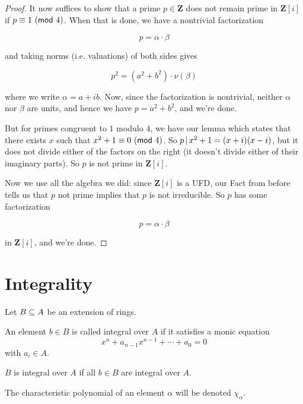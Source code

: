 \begin{proof}
  It now suffices to show that a prime \(p\in{\mathbf Z}\) does not remain prime
  in \({\mathbf Z}[i]\) if \(p\equiv 1\Mod 4\). When that is done, we have a
  nontrivial factorization

  \[ p=\alpha\cdot\beta \]

  and taking norms (i.e. valuations) of both sides gives

  \[ p^2 = (a^2 + b^2) \cdot\nu(\beta) \]

  where we write \(\alpha = a+ib\). Now, since the factorization is nontrivial,
  neither \(\alpha\) nor \(\beta\) are units, and hence we have \( p = a^2 + b^2
  \), and we're done.

  But for primes congruent to \(1\) modulo \(4\), we have our lemma which states
  that there exists \(x\) such that \(x^2+1\equiv 0\Mod 4\). So \(\divides p {x^2+1 =
  (x+i)(x-i)}\), but it does not divide either of the factors on the right (it
  doesn't divide either of their imaginary parts). So \(p\) is not prime in
  \({\mathbf Z}[i]\).

  Now we use all the algebra we did: since \({\mathbf Z}[i]\) is a UFD, our Fact
  from before tells us that \(p\) not prime implies that \(p\) is not
  irreducible. So \(p\) has some factorization

  \[p=\alpha\cdot\beta\]

  in \({\mathbf Z}[i]\), and we're done.
\end{proof}

\section{Integrality}

Let $\ringExtension A B$ be an extension of rings.

\begin{definition}
  An element $b \in B$ is called integral over $A$ if it satisfies a monic equation
  \[ x^n + a_{n-1}x^{n-1} + \cdots + a_0 = 0 \]
  with $a_i \in A$.
\end{definition}

\begin{definition}
  $B$ is integral over $A$ if all $b\in B$ are integral over $A$.
\end{definition}

\begin{definition}
  The characteristic polynomial of an element $\alpha$ will be denoted $\chi_\alpha$.
\end{definition}

